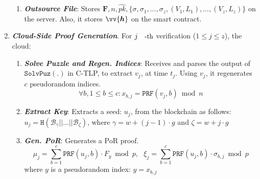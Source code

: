\begin{enumerate}[leftmargin=.46cm]
\begin{enumerate}
\item\label{Outsource-File}\textbf{\textit{\small {Outsource File}}}: Stores ${\bm{F}},n,\hat{pk}, \{\sigma,\sigma_{\scriptscriptstyle 1},..., \sigma_{\scriptscriptstyle z}, (V_{\scriptscriptstyle 1},L_{\scriptscriptstyle 1}),...,(V_{\scriptscriptstyle z},L_{\scriptscriptstyle z})\}$   on the server. Also, it stores $\vv{\bm{h}}$ on the smart contract. 
\end{enumerate}


\item\textit{\textbf{Cloud-Side Proof Generation}}. For   $j\text{\small{-th}}$ verification  ($1\leq j\leq z$), the cloud:


\begin{enumerate} 
\item\label{Solve-Puzzle-Regen-Indices}\textbf{\textit{\small {Solve Puzzle and Regen.  Indices}}}:   Receives and parses the output of $\mathtt{SolvPuz}(.)$ in C-TLP, to extract $v_{\scriptscriptstyle j}$, at time $t_{\scriptscriptstyle j}$. Using $v_{\scriptscriptstyle j}$, it regenerates $c$ pseudorandom indices. 
$$\forall b, 1\leq b\leq c: x_{\scriptscriptstyle b,j}=\mathtt{PRF}(v_{\scriptscriptstyle j}, b)\bmod n$$ %


\item \textbf{\textit{\small {Extract Key}}}: Extracts a seed: $u_{\scriptscriptstyle j}$, from the blockchain as follows: $u_{\scriptscriptstyle j}=\mathtt{H}( \mathcal {B}_{\scriptscriptstyle \gamma}||...||  \mathcal {B}_{\scriptscriptstyle \zeta})$, where $\gamma=w+(j-1)\cdot g$ and $\zeta=w+j\cdot g$

\item\label{Gen-PoR}\textbf{\textit{\small {Gen. PoR}}}: Generates a PoR proof.
 $$\mu_{\scriptscriptstyle j}=\sum\limits^{\scriptscriptstyle c}_{\scriptscriptstyle b=1}  \mathtt{PRF}(u_{\scriptscriptstyle j},b)\cdot F_{\scriptscriptstyle y}\bmod p, \  \  \ \xi_{\scriptscriptstyle j}= \sum\limits^{\scriptscriptstyle c}_{\scriptscriptstyle b=1}  \mathtt{PRF}(u_{\scriptscriptstyle j},b)\cdot \sigma_{\scriptscriptstyle b,j}\bmod p$$
 where  $y$ is a pseudorandom index: $y= x_{\scriptscriptstyle b,j}$ %
 

\end{enumerate}
\end{enumerate}
